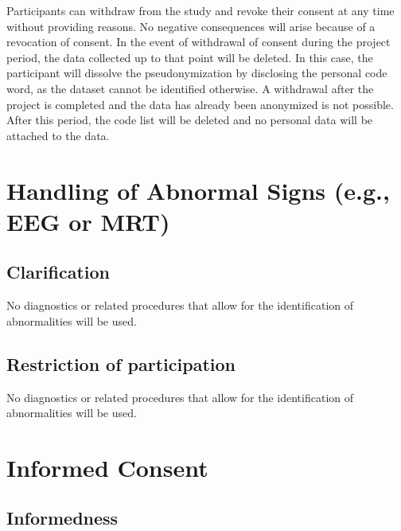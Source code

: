 \documentclass[11pt,twoside,a4paper]{article}
\begin{document}
Participants can withdraw from the study and revoke their consent at any time without providing reasons.
No negative consequences will arise because of a revocation of consent.
In the event of withdrawal of consent during the project period, the data collected up to that point will be deleted.
In this case, the participant will dissolve the pseudonymization by disclosing the personal code word, as the dataset cannot be identified otherwise.
A withdrawal after the project is completed and the data has already been anonymized is not possible.
After this period, the code list will be deleted and no personal data will be attached to the data.

\section{Handling of Abnormal Signs (e.g., EEG or MRT)}

\subsection{Clarification}


No diagnostics or related procedures that allow for the identification of abnormalities will be used.

\subsection{Restriction of participation}


No diagnostics or related procedures that allow for the identification of abnormalities will be used.

\section{Informed Consent}

\subsection{Informedness}
\end{document}
